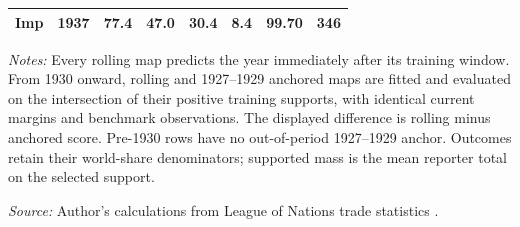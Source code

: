 \begin{table}[!htbp]
\begin{threeparttable}
\begin{tabular}{@{}llrrrrrr@{}}
Imp & 1937 & 77.4 & 47.0 & 30.4 & 8.4 & 99.70 & 346 \\
\bottomrule
\end{tabular}
\begin{tablenotes}[flushleft]\footnotesize\item \textit{Notes:} Every rolling map predicts the year immediately after its training window. From 1930 onward, rolling and 1927--1929 anchored maps are fitted and evaluated on the intersection of their positive training supports, with identical current margins and benchmark observations. The displayed difference is rolling minus anchored score. Pre-1930 rows have no out-of-period 1927--1929 anchor. Outcomes retain their world-share denominators; supported mass is the mean reporter total on the selected support.
\item \textit{Source:} Author's calculations from League of Nations trade statistics \parencite{league1930,league1936,league1938}.
\end{tablenotes}\end{threeparttable}\end{table}
